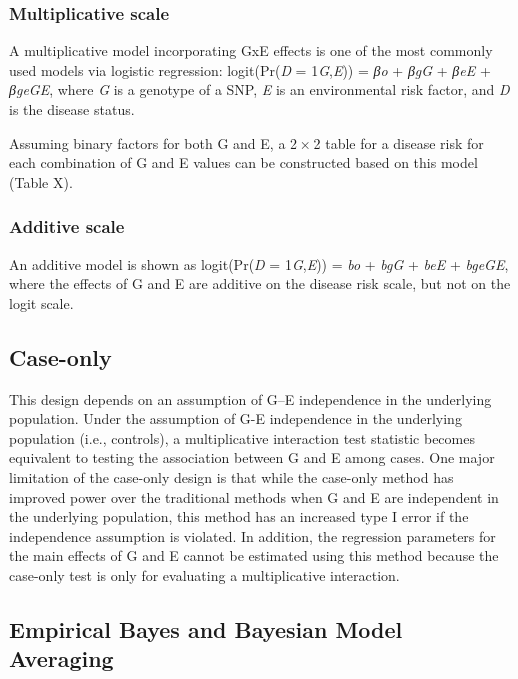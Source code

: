 \documentclass[
]{book}
\begin{document}
\hypertarget{multiplicative-scale}{%
\subsubsection{Multiplicative scale}\label{multiplicative-scale}}

A multiplicative model incorporating GxE effects is one of the most commonly used models via logistic regression: logit(Pr(\emph{D} = 1\textbar{}\emph{G},\emph{E})) = \emph{βo} + \emph{βgG} + \emph{βeE} + \emph{βgeGE}, where \emph{G} is a genotype of a SNP, \emph{E} is an environmental risk factor, and \emph{D} is the disease status.

Assuming binary factors for both G and E, a 2 × 2 table for a disease risk for each combination of G and E values can be constructed based on this model (Table X).

\hypertarget{additive-scale}{%
\subsubsection{Additive scale}\label{additive-scale}}

An additive model is shown as logit(Pr(\emph{D} = 1\textbar{}\emph{G},\emph{E})) = \emph{bo} + \emph{bgG} + \emph{beE} + \emph{bgeGE}, where the effects of G and E are additive on the disease risk scale, but not on the logit scale.

\hypertarget{case-only}{%
\subsection{Case-only}\label{case-only}}

This design depends on an assumption of G--E independence in the underlying population. Under the assumption of G-E independence in the underlying population (i.e., controls), a multiplicative interaction test statistic becomes equivalent to testing the association between G and E among cases. One major limitation of the case-only design is that while the case-only method has improved power over the traditional methods when G and E are independent in the underlying population, this method has an increased type I error if the independence assumption is violated. In addition, the regression parameters for the main effects of G and E cannot be estimated using this method because the case-only test is only for evaluating a multiplicative interaction.

\hypertarget{empirical-bayes-and-bayesian-model-averaging}{%
\subsection{Empirical Bayes and Bayesian Model Averaging}\label{empirical-bayes-and-bayesian-model-averaging}}
\end{document}
